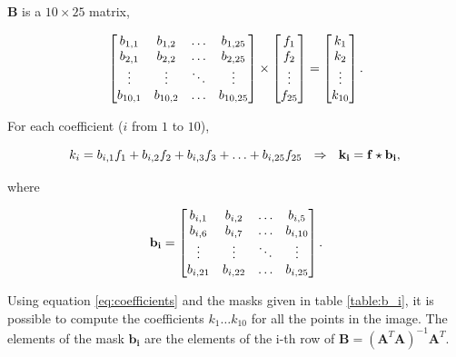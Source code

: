 \documentclass{ipol}
\numberwithin{equation}{section}
\numberwithin{table}{section}
\numberwithin{figure}{section}
\begin{document}
$\mathbf{B}$ is a $10\times25$ matrix, 

\begin{equation*}
	\begin{bmatrix}
		b_{1,1}		& b_{1,2}	& \hdots	& b_{1,25}	\\
		b_{2,1}		& b_{2,2}	& \hdots	& b_{2,25}	\\
		\vdots		& \vdots	& \ddots	& \vdots	\\
		b_{10,1}	& b_{10,2}	& \hdots	& b_{10,25}
	\end{bmatrix}
	\times
	\begin{bmatrix}
		f_1		\\
		f_2		\\
		\vdots	\\
		f_{25}
	\end{bmatrix}
	=
	\begin{bmatrix}
		k_1		\\
		k_2		\\
		\vdots	\\
		k_{10}
	\end{bmatrix} .\\
\end{equation*}

For each coefficient ($i$ from $1$ to $10$), 

\begin{equation}
	\label{eq:coefficients}
	k_i = b_{i,1}f_1 + b_{i,2}f_2 + b_{i,3}f_3 + \hdots + b_{i,25}f_{25} \ \ \Rightarrow \ \ \mathbf{k_i} = \mathbf{f}\star\mathbf{b_i},\\
\end{equation}

where

\begin{equation}
	\label{eq:b_i}
	\mathbf{b_i} = \begin{bmatrix}	b_{i,1}		& b_{i,2}	& \hdots	& b_{i,5}	\\
									b_{i,6}		& b_{i,7}	& \hdots	& b_{i,10}	\\
									\vdots		& \vdots	& \ddots	& \vdots	\\
									b_{i,21}	& b_{i,22}	& \hdots	& b_{i,25}	\\
					\end{bmatrix}.\\
\end{equation}

\vspace{1ex}
Using equation \ref{eq:coefficients} and the masks given in table \ref{table:b_i}, it is possible to compute 
the coefficients $k_1 \hdots k_{10}$ for all the points in the image. The elements of the mask $\mathbf{b_i}$ 
are the elements of the i-th row of $\mathbf{B} = (\mathbf{A}^T\mathbf{A})^{-1}\mathbf{A}^T$.\\
\end{document}
